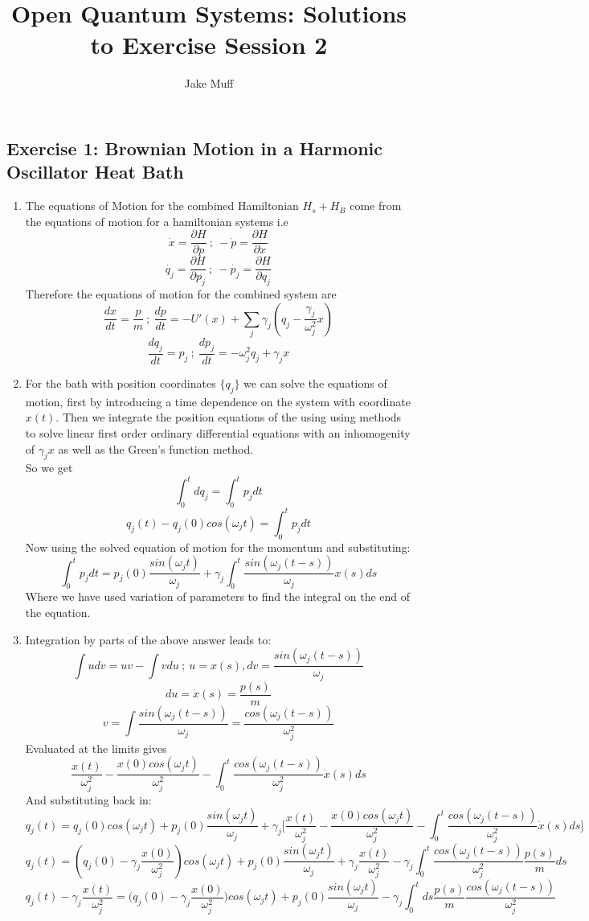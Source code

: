 \documentclass[10pt,a4paper,oneside]{article}
\title{Open Quantum Systems: Solutions to Exercise Session 2}
\author{Jake Muff}
\begin{document}
\maketitle
\subsection*{Exercise 1: Brownian Motion in a Harmonic Oscillator Heat Bath}
\begin{enumerate}
    \item The equations of Motion for the combined Hamiltonian $H_s + H_B$ come from the equations of motion for a hamiltonian systems i.e
    $$ \dot{x} = \frac{\partial H}{\partial p} \ ;\ -\dot{p} = \frac{\partial H}{\partial x}$$
    $$ \dot{q_j} = \frac{\partial H}{\partial p_j} \ ;\ -\dot{p_j} = \frac{\partial H}{\partial q_j}$$
    Therefore the equations of motion for the combined system are 
    $$ \frac{dx}{dt} = \frac{p}{m} \ ; \ \frac{dp}{dt} = - U'(x) + \sum_j \gamma_j(q_j - \frac{\gamma_j}{\omega_j^2}x) $$
    $$ \frac{dq_j}{dt} = p_j \ ;\ \frac{dp_j}{dt} = - \omega_j^2 q_j + \gamma_j x $$

    \item For the bath with position coordinates $\{q_j\}$ we can solve the equations of motion, first by introducing a time dependence on the system with coordinate $x(t)$. Then we integrate the position equations of the using using methods to solve linear first order ordinary differential equations with an inhomogenity of $\gamma_j x$ as well as the Green's function method. 
    \\ So we get
    $$ \int_0^t dq_j = \int_0^t p_j dt $$
    $$ q_j(t) - q_j(0)cos(\omega_j t) = \int_0^t p_j dt $$
    Now using the solved equation of motion for the momentum and substituting:
    $$ \int_0^t p_j dt = p_j(0) \frac{sin(\omega_j t)}{\omega_j} + \gamma_j \int_0^t \frac{sin(\omega_j(t-s))}{\omega_j} x(s) ds $$
    Where we have used variation of parameters to find the integral on the end of the equation. 

    \item Integration by parts of the above answer leads to:
    $$ \int u dv = uv - \int v du \ ; \ u = x(s), dv = \frac{sin (\omega_j(t-s))}{\omega_j} $$
    $$ du = \dot{x}(s) = \frac{p(s)}{m} $$
    $$ v = \int \frac{sin(\omega_j(t-s))}{\omega_j} = \frac{cos(\omega_j(t-s))}{\omega_j^2}$$
    Evaluated at the limits gives
    $$ \frac{x(t)}{\omega_j^2} - \frac{x(0)cos(\omega_j t)}{\omega_j^2} - \int_0^t \frac{cos(\omega_j (t-s))}{\omega_j^2}\dot{x}(s) ds  $$
    And substituting back in:
    $$ q_j(t) = q_j(0)cos(\omega_j t) + p_j(0)\frac{sin(\omega_j t)}{\omega_j} + \gamma_j \Big[\frac{x(t)}{\omega_j^2} - \frac{x(0)cos(\omega_j t)}{\omega_j^2} - \int_0^t \frac{cos(\omega_j (t-s))}{\omega_j^2}\dot{x}(s)ds \Big]$$
    $$ q_j(t) = (q_j(0)-\gamma_j \frac{x(0)}{\omega_j^2})cos(\omega_j t) + p_j(0)\frac{sin(\omega_j t)}{\omega_j} + \gamma_j \frac{x(t)}{\omega_j^2} - \gamma_j \int_0^t \frac{cos(\omega_j (t-s))}{\omega_j^2} \frac{p(s)}{m} ds$$
    $$ q_j(t) - \gamma_j \frac{x(t)}{\omega_j^2} = \Big(q_j(0)-\gamma_j \frac{x(0)}{\omega_j^2}\Big)cos(\omega_j t) + p_j(0)\frac{sin(\omega_j t)}{\omega_j} - \gamma_j \int_0^t ds \frac{p(s)}{m} \frac{cos(\omega_j (t-s))}{\omega_j^2}  $$


\end{enumerate}
\end{document}
